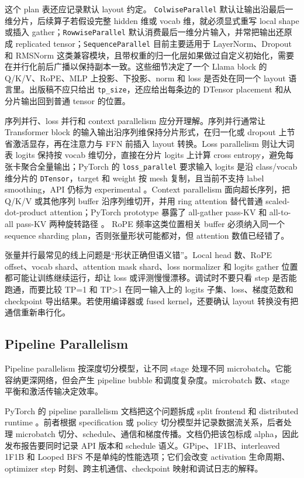 \documentclass[UTF8,zihao=-4,openany]{ctexbook}
\begin{document}
这个 plan 表还应记录默认 layout 约定。 \texttt{ColwiseParallel} 默认让输出沿最后一维分片，后续算子若假设完整 hidden 维或 vocab 维，就必须显式重写 local shape 或插入 gather；\texttt{RowwiseParallel} 默认消费最后一维分片输入，并常把输出还原成 replicated tensor；\texttt{SequenceParallel} 目前主要适用于 LayerNorm、Dropout 和 RMSNorm 这类兼容模块，且带权重的归一化层如果做过自定义初始化，需要在并行化前后广播以保持副本一致。这些细节决定了一个 Llama block 的 Q/K/V、RoPE、MLP 上投影、下投影、norm 和 loss 是否处在同一个 layout 语言里。出版稿不应只给出 \texttt{tp\_size}，还应给出每条边的 DTensor placement 和从分片输出回到普通 tensor 的位置。

序列并行、loss 并行和 context parallelism 应分开理解。序列并行通常让 Transformer block 的输入输出沿序列维保持分片形式，在归一化或 dropout 上节省激活显存，再在注意力与 FFN 前插入 layout 转换。Loss parallelism 则让大词表 logits 保持按 vocab 维切分，直接在分片 logits 上计算 cross entropy，避免每张卡聚合全量输出；PyTorch 的 \texttt{loss\_parallel} 要求输入 logits 是沿 class/vocab 维分片的 \texttt{DTensor}，target 和 weight 按 mesh 复制，且当前不支持 label smoothing，API 仍标为 experimental \cite{pytorch2026tensorparallelapi}。Context parallelism 面向超长序列，把 Q/K/V 或其他序列 buffer 沿序列维切开，并用 ring attention 替代普通 scaled-dot-product attention；PyTorch prototype 暴露了 all-gather pass-KV 和 all-to-all pass-KV 两种旋转路径 \cite{pytorch2025contextparallel}。 RoPE 频率这类位置相关 buffer 必须纳入同一个 sequence sharding plan，否则张量形状可能都对，但 attention 数值已经错了。

张量并行最常见的线上问题是“形状正确但语义错”。Local head 数、RoPE offset、vocab shard、attention mask shard、loss normalizer 和 logits gather 位置都可能让训练继续运行，却让 loss 或评测慢慢漂移。调试时不要只看 step 是否能跑通，而要比较 TP=1 和 TP>1 在同一输入上的 logits 子集、loss、梯度范数和 checkpoint 导出结果。若使用编译器或 fused kernel，还要确认 layout 转换没有把通信重新串行化。

\subsection{Pipeline Parallelism}
Pipeline parallelism 按深度切分模型，让不同 stage 处理不同 microbatch。它能容纳更深网络，但会产生 pipeline bubble 和调度复杂度。microbatch 数、stage 平衡和激活传输决定效率。

PyTorch 的 pipeline parallelism 文档把这个问题拆成 split frontend 和 distributed runtime \cite{pytorch2026pipelining}。前者根据 specification 或 policy 切分模型并记录数据流关系，后者处理 microbatch 切分、schedule、通信和梯度传播。文档仍把该包标成 alpha，因此发布报告要同时记录 API 版本和 schedule 语义。GPipe、1F1B、interleaved 1F1B 和 Looped BFS 不是单纯的性能选项；它们会改变 activation 生命周期、optimizer step 时刻、跨主机通信、checkpoint 映射和调试日志的解释。
\end{document}
